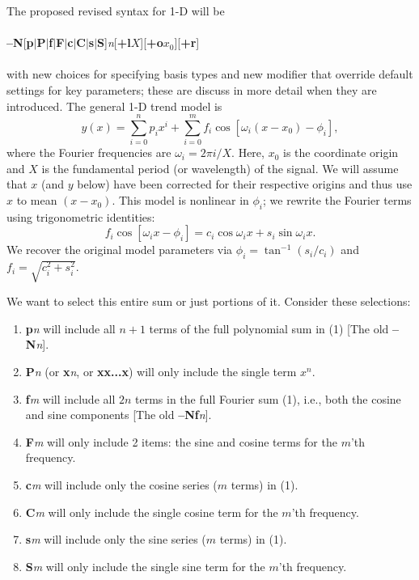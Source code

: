 \documentclass[12pt,letterpaper,margin=0.5in]{report}
\begin{document}
The proposed revised syntax for 1-D will be
\\ \\
{\bf --N}[{\bf p}$|${\bf P}$|${\bf f}$|${\bf F}$|${\bf c}$|${\bf C}$|${\bf s}$|${\bf S}]{\it n}[{\bf +l}$X$][{\bf +o}$x_0$][{\bf +r}]
\\ \\
with new choices for specifying basis types and new modifier that override default settings for key parameters; these are discuss
in more detail when they are introduced.
The general 1-D trend model is
\begin{equation}
y(x) = \sum_{i = 0}^n p_i x^i + \sum_{i = 0}^m  f_i \cos \left [\omega_i (x-x_0) - \phi_i \right ],
\end{equation}
where the Fourier frequencies are $\omega_i = 2 \pi i / X$.  Here, $x_0$ is the coordinate origin and $X$ is the fundamental period (or wavelength) of the signal.
We will assume that $x$ (and $y$ below) have been corrected for their respective origins and thus
use $x$ to mean $(x-x_0)$.  This model is nonlinear in  $\phi_i$; we rewrite the Fourier terms using trigonometric identities:
\begin{equation}
f_i \cos \left [\omega_i x - \phi_i \right ] =  c_i \cos \omega_i x  + s_i \sin \omega_i x .
\end{equation}
We recover the original model parameters via $\phi_i = \tan^{-1}(s_i/c_i)$ and $f_i = \sqrt{c_i^2 + s_i^2}$.
\par
We want to select this entire sum or just portions of it.  Consider these selections:
\begin{enumerate}
	\item {\bf p}{\it n} will include all $n+1$ terms of the full polynomial sum in (1) [The old {\bf --N}{\it n}].
	\item {\bf P}{\it n} (or {\bf x}{\it n}, or {\bf xx...x}) will only include the single term $x^n$.
	\item {\bf f}{\it m} will include all $2n$ terms in the full Fourier sum (1), i.e., both the cosine and sine components [The old {\bf --Nf}{\it n}].
	\item {\bf F}{\it m} will only include 2 items: the sine and cosine terms for the $m$'th frequency.
	\item {\bf c}{\it m} will include only the cosine series ($m$ terms) in (1).
	\item {\bf C}{\it m} will only include the single cosine term for the $m$'th frequency.
	\item {\bf s}{\it m} will include only the sine series ($m$ terms) in (1).
	\item {\bf S}{\it m} will only include the single sine term for the $m$'th frequency.
\end{enumerate}
\end{document}

